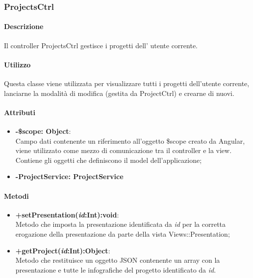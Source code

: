 \newpage
\subsubsection{ProjectsCtrl}
	\paragraph{Descrizione}
	Il controller ProjectsCtrl gestisce i progetti dell' utente corrente.
	
	\paragraph{Utilizzo}
	Questa classe viene utilizzata per visualizzare tutti i progetti dell'utente corrente, lanciarne la modalità di modifica (gestita da ProjectCtrl) e crearne di nuovi.\\
	\paragraph{Attributi}
	\begin{itemize}
		\item \textbf{-\$scope: Object}:\\
			Campo dati contenente un riferimento all'oggetto \$scope creato da Angular, viene utilizzato come mezzo di comunicazione tra il controller e la view. Contiene gli oggetti che definiscono il model dell'applicazione;
		\item \textbf{-ProjectService: ProjectService}
	\end{itemize}
	
	\paragraph{Metodi}
	\begin{itemize}
	  \item \textbf{+setPresentation(\textit{id}:Int):void}:\\
		  Metodo che imposta la presentazione identificata da  \textit{id} per la corretta erogazione della presentazione da parte della vista Views::Presentation;
	  \item \textbf{+getProject(\textit{id}:Int):Object}:\\
		  Metodo che restituisce un oggetto JSON contenente un array con la presentazione e tutte le infografiche del progetto identificato da \textit{id}.
		  
	\end{itemize}
